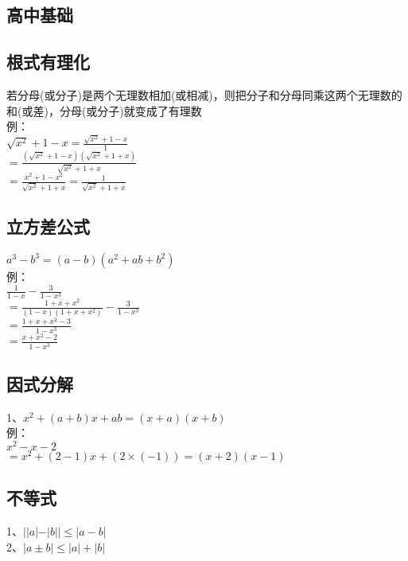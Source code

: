 \documentclass{article}
\begin{document}
\begin{flushleft}
	\LARGE
	
	\section{高中基础}
	
	\subsection{根式有理化}
	若分母(或分子)是两个无理数相加(或相减)，则把分子和分母同乘这两个无理数的和(或差)，分母(或分子)就变成了有理数\\
	例：\\
	\qquad $\sqrt{x^2}+1-x=\frac{\sqrt{x^2}+1-x}{1}$\\
	\qquad $=\frac{(\sqrt{x^2}+1-x)(\sqrt{x^2}+1+x)}{\sqrt{x^2}+1+x}$\\
	\qquad $=\frac{x^2+1-x^2}{\sqrt{x^2}+1+x}=\frac{1}{\sqrt{x^2}+1+x}$\\
	
	\subsection{立方差公式}
	$a^3-b^3=(a-b)(a^2+ab+b^2)$\\
	例：\\
	\qquad $\frac{1}{1-x}-\frac{3}{1-x^3}$\\
	\qquad $=\frac{1+x+x^2}{(1-x)(1+x+x^2)}-\frac{3}{1-x^3}$\\
	\qquad $=\frac{1+x+x^2-3}{1-x^3}$\\
	\qquad $=\frac{x+x^2-2}{1-x^3}$\\
	
	\subsection{因式分解}
	1、$x^2+(a+b)x+ab=(x+a)(x+b)$\\
	例：\\
	\qquad $x^2-x-2$\\
	\qquad $=x^2+(2-1)x+(2\times(-1))=(x+2)(x-1)$\\
	
	\subsection{不等式}
	1、$||a|-|b||\le |a-b|$\\
	2、$|a\pm b|\le |a|+|b|$\\
	

\end{flushleft}
\end{document}
